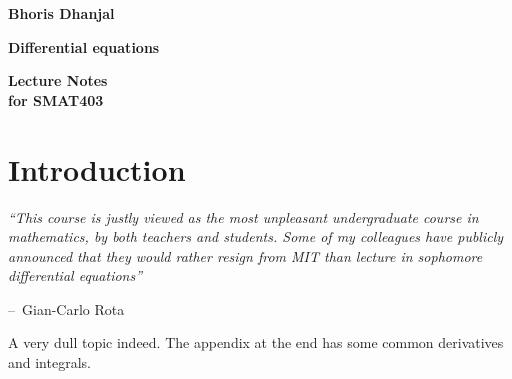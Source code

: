 \documentclass[oneside,11pt,pdftex,final]{book}%
\makeatletter
\numberwithin{equation}{section}
\newenvironment{chapquote}[2][2em]
{\setlength{\@tempdima}{#1}%
	\def\chapquote@author{#2}%
	\parshape 1 \@tempdima \dimexpr\textwidth-2\@tempdima\relax%
	\itshape}
{\par\normalfont\hfill--\ \chapquote@author\hspace*{\@tempdima}\par\bigskip}
\numberwithin{section}{chapter}
\numberwithin{equation}{chapter}
\makeatother
\begin{document}
	
	
	\frontmatter

\thispagestyle{empty}
\begin{flushright}
{\LARGE \textbf{Bhoris Dhanjal}}%
\end{flushright}
\vfill
\begin{center}
{\fontsize{29.86truept}{0truept}\selectfont \textbf{Differential equations}}%
\end{center}
\vfill
\begin{flushleft}
{\LARGE \textbf{Lecture Notes}} \\
\hspace{-1.75truept}
{\large \textbf{for SMAT403}}
\end{flushleft}
\newpage

\tableofcontents


\mainmatter
\chapter*{Introduction}
\begin{chapquote}{Gian-Carlo Rota}
	``This course is justly viewed as the
	most unpleasant undergraduate course in mathematics, by both teachers and students. Some of
	my colleagues have publicly announced that they would rather resign from MIT than lecture in
	sophomore differential equations''
\end{chapquote}
A very dull topic indeed. The appendix at the end has some common derivatives and integrals.		

\end{document}
